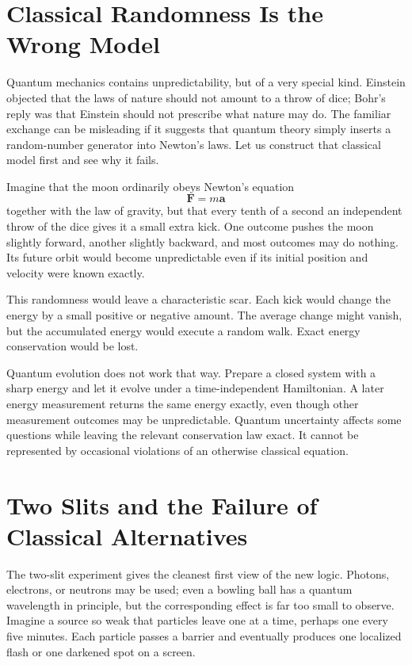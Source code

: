 \section{Classical Randomness Is the Wrong Model}

Quantum mechanics contains unpredictability, but of a very special kind.
Einstein objected that the laws of nature should not amount to a throw of
dice; Bohr's reply was that Einstein should not prescribe what nature may do.
The familiar exchange can be misleading if it suggests that quantum theory
simply inserts a random-number generator into Newton's laws. Let us construct
that classical model first and see why it fails.

Imagine that the moon ordinarily obeys Newton's equation
\begin{equation}
 \mathbf F=m\mathbf a
\end{equation}
together with the law of gravity, but that every tenth of a second an
independent throw of the dice gives it a small extra kick. One outcome pushes
the moon slightly forward, another slightly backward, and most outcomes may
do nothing. Its future orbit would become unpredictable even if its initial
position and velocity were known exactly.

This randomness would leave a characteristic scar. Each kick would change
the energy by a small positive or negative amount. The average change might
vanish, but the accumulated energy would execute a random walk. Exact energy
conservation would be lost.

Quantum evolution does not work that way. Prepare a closed system with a
sharp energy and let it evolve under a time-independent Hamiltonian. A later
energy measurement returns the same energy exactly, even though other
measurement outcomes may be unpredictable. Quantum
uncertainty affects some questions while leaving the relevant conservation
law exact. It cannot be represented by occasional violations of an otherwise
classical equation.

\section{Two Slits and the Failure of Classical Alternatives}

The two-slit experiment gives the cleanest first view of the new logic.
Photons, electrons, or neutrons may be used; even a bowling ball has a
quantum wavelength in principle, but the corresponding effect is far too
small to observe. Imagine a source so weak that particles leave one at a
time, perhaps one every five minutes. Each particle passes a barrier and
eventually produces one localized flash or one darkened spot on a screen.


